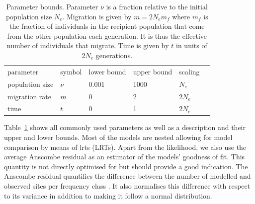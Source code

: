 \documentclass[hidelinks,11pt]{article}
\begin{document}
    \begin{table}[H]
        \begin{center}
            \begin{tabular}{| l | l | l | l | l | l |}
                parameter       & symbol & lower bound & upper bound & scaling \\
                population size & $\nu$  & 0.001       & 1000        & $N_e$   \\
                migration rate  & $m$    & 0           & 2           & $2N_e$  \\
                time            & $t$    & 0           & 1           & $2N_e$  \\
            \end{tabular}
        \end{center}
        \caption{Parameter bounds. Parameter $\nu$ is a fraction relative to the initial population size $N_e$. Migration is given by $m=2N_e m_f$ where $m_f$ is the fraction of individuals in the recipient population that come from the other population each generation. It is thus the effective number of individuals that migrate. Time is given by $t$ in units of $2N_e$ generations.}
        \label{tbl:param_bounds}
    \end{table}

    Table~\ref{tbl:param_bounds} shows all commonly used parameters as well as a description and their upper and lower bounds. Most of the models are nested allowing for model comparison by means of \acrlong{lrt}s (LRTs). Apart from the likelihood, we also use the average Anscombe residual as an estimator of the models' goodness of fit. This quantity is not directly optimised for but should provide a good indication. The Anscombe residual quantifies the difference between the number of modelled and observed sites per frequency class \cite{dadi-docs}. It also normalises this difference with respect to its variance in addition to making it follow a normal distribution.
\end{document}
